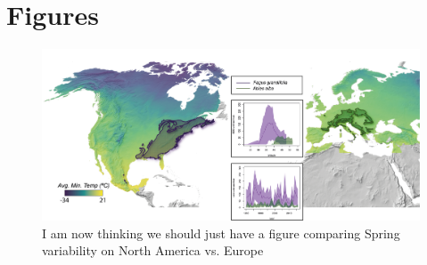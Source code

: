 \documentclass[12pt]{article}
\begin{document}

\section*{Figures}

\begin{figure}[h!]
    \centering
 \includegraphics[width=\textwidth]{..//..//analyses/ranges/figures/concept figure draft2.png} 
    \caption{I am now thinking we should just have a figure comparing Spring variability on North America vs. Europe}%
    \label{fig:concept}
\end{figure}
\end{document}
